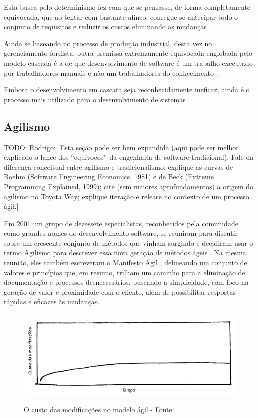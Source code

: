 Esta busca pelo determinismo fez com que se pensasse, de forma completamente equivocada, que ao tentar com bastante afinco, consegue-se antecipar todo o conjunto de requisitos e reduzir os custos eliminando as mudanças \cite{TheBusinessOfInnovation}.

Ainda se baseando no processo de produção industrial, desta vez no gerenciamento fordista, outra premissa extremamente equivocada englobada pelo modelo cascada é a de que desenvolvimento de software é um trabalho executado por trabalhadores manuais e não um trabalhadores do conhecimento \cite[38]{XPTeles}.

Embora o desenvolvimento em cascata seja reconhecidamente ineficaz, ainda é o processo mais utilizado para o desenvolvimento de sistemas \cite{XPTeles}.



\subsection{Agilismo} %
\label{sub:agilismo}

TODO: Rodrigo: [Esta seção pode ser bem expandida (aqui pode ser melhor explicado o lance dos ``equívocos"\ da engenharia de software tradicional). Fale da diferença conceitual entre agilismo e tradicionalismo; explique as curvas de Boehm (Software Engineering Economics, 1981) e de Beck (Extreme Programming Explained, 1999); cite (sem maiores aprofundamentos) a origem do agilismo no Toyota Way; explique iteração e release no contexto de um processo ágil.]

Em 2001 um grupo de dezessete especialistas, reconhecidos pela comunidade como grandes nomes do desenvolvimento software, se reuniram para discutir sobre um crescente conjunto de métodos que vinham surgindo e decidiram usar o termo Agilismo para descrever essa nova geração de métodos ágeis \cite{AgileStory}. Na mesma reunião, eles também escreveram o Manifesto Ágil \cite{AgileManifesto}, delineando um conjunto de valores e princípios que, em resumo, trilham um caminho para a eliminação de documentação e processos desnecessários, buscando a simplicidade, com foco na geração de valor e proximidade com o cliente, além de possibilitar respostas rápidas e eficazes às mudanças.

\begin{figure}[h]
  \center
  \caption{O custo das modificações no modelo ágil - Fonte: \cite{XPKent}}
  \includegraphics[scale=0.45]{images/custo-agile}
  \label{img:custo-agile}
\end{figure}

